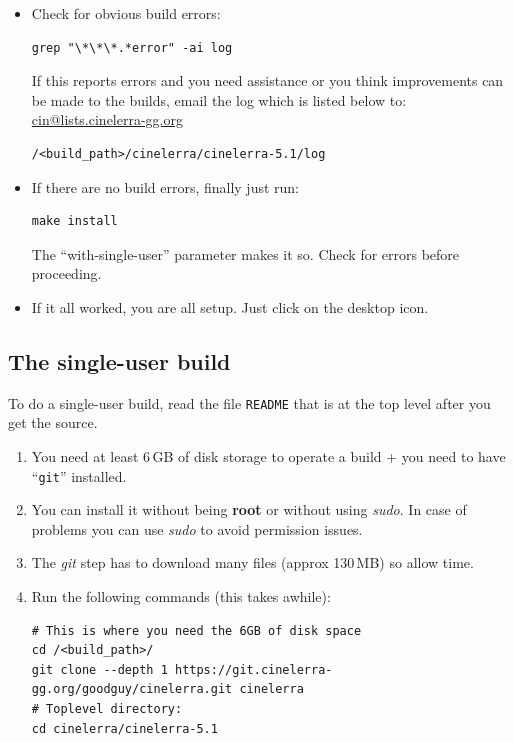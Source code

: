 \begin{itemize}
  Options in \textit{bld\_prepare.sh} of debian-older and ubuntu-older are currently for older operating system versions since before about 06/2022. The ubuntu24 option is for Ubuntu version 24 and newer ubuntu distros.

\item Check for obvious build errors:
\begin{lstlisting}[style=sh]
grep "\*\*\*.*error" -ai log
\end{lstlisting}
  If this reports errors and you need assistance or you think
  improvements can be made to the builds, email the log which is
  listed below to:
  \href{mailto:cin@lists.cinelerra-gg.org}{cin@lists.cinelerra-gg.org}
\begin{lstlisting}[style=sh]
/<build_path>/cinelerra/cinelerra-5.1/log
\end{lstlisting}

\item If there are no build errors, finally just run:
\begin{lstlisting}[style=sh]
make install
\end{lstlisting}
The ``with-single-user'' parameter makes it so.
Check for errors before proceeding.


\item If it all worked, you are all setup. Just click on the \CGG{}
  desktop icon.
\end{itemize}


\subsection{The single-user build}
\label{sec:single-user-build}

To do a single-user build, read the file \texttt{README} that is at
the top level after you get the source.

\begin{enumerate}
\item You need at least 6\,GB of disk storage to operate a build +
  you need to have “\texttt{git}” installed.

\item You can install it without being \textbf{root} or without using \textit{sudo}. In case of problems you can use \textit{sudo} to avoid permission issues.
\item The \textit{git} step has to download many files (approx
  130\,MB) so allow time.

\item Run the following commands (this takes awhile):
\begin{lstlisting}[style=sh]
# This is where you need the 6GB of disk space
cd /<build_path>/
git clone --depth 1 https://git.cinelerra-gg.org/goodguy/cinelerra.git cinelerra
# Toplevel directory:
cd cinelerra/cinelerra-5.1
\end{lstlisting}
\end{enumerate}

